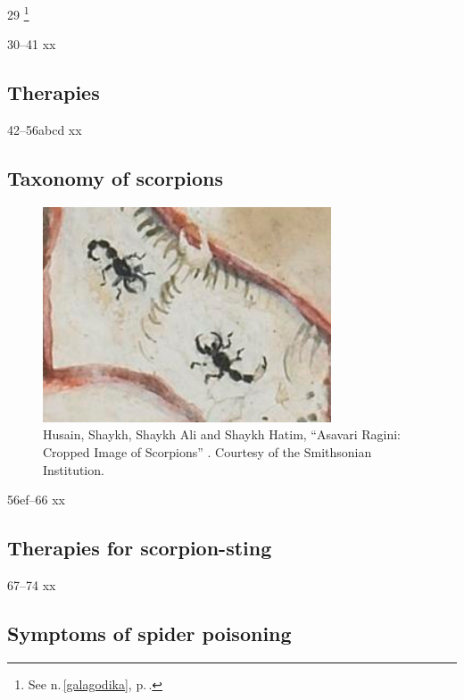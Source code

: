 \begin{translation}
\item [29] \footnote{See n.\,\ref{galagodika}, 
p.\,\pageref{galagodika}.}


\item[30--41] xx

\subsection{Therapies}

\item[42--56abcd] xx
 
\subsection{Taxonomy of scorpions}
 
 \begin{figure}
     \centering
     \includegraphics[width=0.7\linewidth]{"media/Scorpions Smithsonian"}
     \caption{Husain, Shaykh, Shaykh Ali and Shaykh Hatim, “Asavari Ragini: 
     Cropped Image of Scorpions” \citep{husa-1591}. Courtesy of the Smithsonian 
     Institution.}
     \label{fig:scorpions-smithsonian}
 \end{figure}
 
 
 \item [56ef--66] xx
 
 \subsection{Therapies for scorpion-sting}
 
 \item[67--74] xx
 
 \subsection{Symptoms of spider poisoning}
 

\end{translation}

